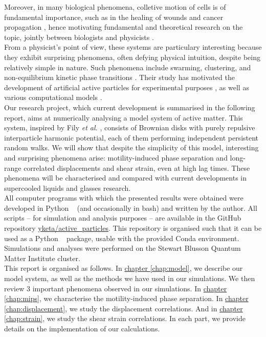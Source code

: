 \documentclass[class=report, float=false, crop=false]{standalone}
\begin{document}
Moreover, in many biological phenomena, colletive motion of cells is of fundamental importance, such as in the healing of wounds \cite{haga2005collective} and cancer propagation \cite{friedl2009collective}, hence motivating fundamental and theoretical research on the topic, jointly between biologists and physicists \cite{garcia2015physics}.\\

From a physicist's point of view, these systems are particulary interesting because they exhibit surprising phenomena, often defying physical intuition, despite being relatively simple in nature. Such phenomena include swarming, clustering, and non-equilibrium kinetic phase transitions \cite{vicsek1995novel, szabo2006phase}. Their study has motivated the development of artificial active particles for experimental purposes \cite{howse2007self, theurkauff2012dynamic}, as well as various computational models \cite{garcia2015physics, vicsek1995novel, levis2014clustering, wysocki2014cooperative, fily2014freezing, redner2013structure}.\\

Our research project, which current development is summarised in the following report, aims at numerically analysing a model system of active matter. This system, inspired by Fily \textit{et al.} \cite{fily2012athermal, fily2014freezing}, consists of Brownian disks with purely repulsive interparticle harmonic potential, each of them performing independent persistent random walks. We will show that despite the simplicity of this model, interesting and surprising phenomena arise: motility-induced phase separation and long-range correlated displacements and shear strain, even at high lag times. These phenomena will be characterised and compared with current developments in supercooled liquids and glasses research.\\

All computer programs with which the presented results were obtained were developed in Python \faPython~ (and occasionally in bash) and written by the author. All scripts -- for simulation and analysis purposes -- are available in the GitHub \faGithub~ repository \href{https://github.com/yketa/active_particles}{yketa/active\_particles}. This repository is organised such that it can be used as a Python \faPython~ package, usable with the provided Conda environment. Simulations and analyses were performed on the Stewart Blusson Quantum Matter Institute cluster.\\

This report is organised as follows. In \hyperref[chap:model]{chapter \ref{chap:model}}, we describe our model system, as well as the methods we have used in our simulations. We then review 3 important phenomena observed in our simulations. In \hyperref[chap:mips]{chapter \ref{chap:mips}}, we characterise the motility-induced phase separation. In \hyperref[chap:displacement]{chapter \ref{chap:displacement}}, we study the displacement correlations. And in \hyperref[chap:strain]{chapter \ref{chap:strain}}, we study the shear strain correlations. In each part, we provide details on the implementation of our calculations.
\end{document}
